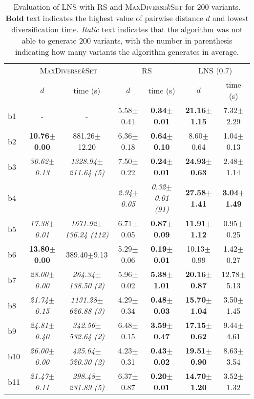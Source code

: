 \begin{longtable}{|l|c|c|c|c|c|c|}
\caption{\label{tab:dist_max_rs_lns} Evaluation of \ac{LNS} with \ac{RS} and \textsc{MaxDiverse$k$Set}
		for 200 variants. \textbf{Bold} text indicates the highest value of pairwise distance $d$
		and lowest diversification time. \textit{Italic} text indicates that the algorithm was not able to generate
		200 variants, with the number in parenthesis indicating how many variants the algorithm generates in average.}\\
\hline
&\multicolumn{2}{c|}{\textsc{MaxDiverse$k$Set}}&\multicolumn{2}{c|}{{RS}}&\multicolumn{2}{c|}{LNS (0.7)}\\
\cline{2-7}
&$d$&time (s)&$d$&time (s)&$d$&time (s)\\
\hline
b1&- & -&5.58$\pm$0.41 & \textbf{0.34$\pm$0.01}&\textbf{21.16$\pm$1.15} & 7.32$\pm$2.29
\\
b2&\textbf{10.76$\pm$0.00} & 881.26$\pm$12.20&6.36$\pm$0.18 & \textbf{0.64$\pm$0.10}&8.60$\pm$0.64 & 1.04$\pm$0.13
\\
b3&\textit{30.62$\pm$0.13} & \textit{1328.94$\pm$211.64 (5)}&7.50$\pm$0.22 & \textbf{0.24$\pm$0.01}&\textbf{24.93$\pm$0.63} & 2.48$\pm$1.14
\\
b4&- & -&\textit{2.94$\pm$0.05} & \textit{0.32$\pm$0.01 (91)}&\textbf{27.58$\pm$1.41} & \textbf{3.04$\pm$1.49}
\\
b5&\textit{17.38$\pm$0.01} & \textit{1671.92$\pm$136.24 (112)}&6.71$\pm$0.05 & \textbf{0.87$\pm$0.09}&\textbf{11.91$\pm$1.12} & 0.95$\pm$0.25
\\
b6&\textbf{13.80$\pm$0.00} & 389.40$\pm$9.13&5.29$\pm$0.06 & \textbf{0.19$\pm$0.01}&10.13$\pm$0.99 & 1.42$\pm$0.27
\\
b7&\textit{28.00$\pm$0.00} & \textit{264.34$\pm$138.50 (2)}&5.96$\pm$0.02 & \textbf{5.38$\pm$1.01}&\textbf{20.16$\pm$0.87} & 12.78$\pm$5.13
\\
b8&\textit{21.74$\pm$0.15} & \textit{1131.28$\pm$626.88 (3)}&4.29$\pm$0.34 & \textbf{0.48$\pm$0.03}&\textbf{15.70$\pm$1.04} & 3.50$\pm$1.45
\\
b9&\textit{24.81$\pm$0.40} & \textit{342.56$\pm$532.64 (2)}&6.48$\pm$0.15 & \textbf{3.59$\pm$0.47}&\textbf{17.15$\pm$0.62} & 9.44$\pm$4.61
\\
b10&\textit{26.00$\pm$0.00} & \textit{425.64$\pm$320.30 (2)}&4.23$\pm$0.31 & \textbf{0.43$\pm$0.02}&\textbf{19.51$\pm$0.90} & 8.63$\pm$3.54
\\
b11&\textit{21.47$\pm$0.11} & \textit{298.48$\pm$231.89 (5)}&6.37$\pm$0.87 & \textbf{0.20$\pm$0.01}&\textbf{14.70$\pm$1.20} & 3.52$\pm$1.32

\end{longtable}
